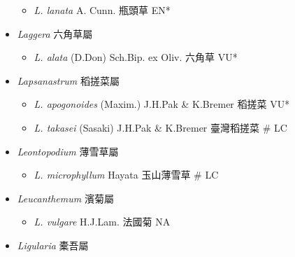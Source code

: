 \begin{itemize}
  \begin{itemize}
        \item[] \textit{L. lanata} A. Cunn.  瓶頭草   EN*
  \end{itemize}
 \item[] \textit{Laggera} 六角草屬
                                
  \begin{itemize}
        \item[] \textit{L. alata} (D.Don) Sch.Bip. ex Oliv.  六角草   VU*
  \end{itemize}
 \item[] \textit{Lapsanastrum} 稻搓菜屬
                                
  \begin{itemize}
        \item[] \textit{L. apogonoides} (Maxim.) J.H.Pak \& K.Bremer  稻搓菜   VU*
        \item[] \textit{L. takasei} (Sasaki) J.H.Pak \& K.Bremer  臺灣稻搓菜  \# LC
  \end{itemize}
 \item[] \textit{Leontopodium} 薄雪草屬
                                
  \begin{itemize}
        \item[] \textit{L. microphyllum} Hayata  玉山薄雪草  \# LC
  \end{itemize}
 \item[] \textit{Leucanthemum} 濱菊屬
                                
  \begin{itemize}
        \item[] \textit{L. vulgare} H.J.Lam.  法國菊   NA
  \end{itemize}
 \item[] \textit{Ligularia} 橐吾屬
                                

\end{itemize}
